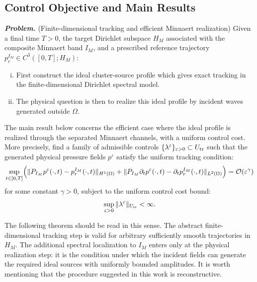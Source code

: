 \documentclass[11pt,a4paper]{article}
\numberwithin{equation}{section}
\begin{document}
\subsection{Control Objective and Main Results}
\noindent
\textit{\textbf{Problem.}} \Big(Finite-dimensional tracking and efficient Minnaert realization\Big)
Given a final time $T > 0$, the target Dirichlet subspace $H_M$ associated with the composite Minnaert band $I_M$, and a prescribed reference trajectory $p_r^{I_M} \in C^3([0,T]; H_M)$:
\begin{enumerate}[(i)]
\item First construct the ideal cluster-source profile which gives exact tracking in the finite-dimensional Dirichlet spectral model. 
\item The physical question is then to realize this ideal profile by incident waves generated outside $\Omega$. 
\end{enumerate}
The main result below concerns the efficient case where the ideal profile is realized through the separated Minnaert channels, with a uniform control cost. More precisely, find a family of admissible controls $\{\lambda^\varepsilon\}_{\varepsilon > 0} \subset U_{\rm tr}$ such that the generated physical pressure fields $p^\varepsilon$ satisfy the uniform tracking condition:
\begin{equation*}
 \sup_{t\in[0,T]} 
 \Bigl( 
  \|P_{I_M} p^\varepsilon(\cdot,t) - p_r^{I_M}(\cdot,t)\|_{H^1(\Omega)} 
  + 
  \|P_{I_M} \partial_t p^\varepsilon(\cdot,t) - \partial_t p_r^{I_M}(\cdot,t)\|_{L^2(\Omega)} 
 \Bigr) 
 = \mathcal{O}(\varepsilon^\gamma)
\end{equation*}
for some constant $\gamma > 0$, subject to the uniform control cost bound:
\begin{equation*}
 \sup_{\varepsilon > 0} \|\lambda^\varepsilon\|_{U_{\rm tr}} < \infty.
\end{equation*}

\noindent
The following theorem should be read in this sense. The abstract finite-dimensional tracking step is valid for arbitrary sufficiently smooth trajectories in $H_M$. The additional spectral localization to $I_M$ enters only at the physical realization step: it is the condition under which the incident fields can generate the required ideal sources with uniformly bounded amplitudes. It is worth mentioning that the procedure suggested in this work is reconstructive.
\end{document}

